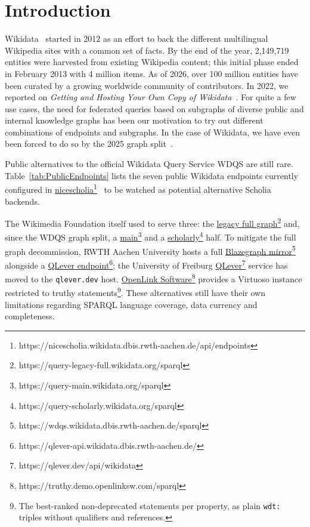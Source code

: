 \documentclass[
]{ceurart}
\newcommand{\footnotelink}[2]{\href{#1}{#2}\footnote{#1}}
\begin{document}
\section{Introduction}\label{sec:introduction}
Wikidata~\cite{Vrandecic2014} started in 2012 as an effort to back the different multilingual Wikipedia sites with a common set of facts. By the end of the year, 2,149,719 entities were harvested from existing Wikipedia content; this initial phase ended in February 2013 with 4 million items. As of 2026, over 100 million entities have been curated by a growing worldwide community of contributors. In 2022, we reported on \emph{Getting and Hosting Your Own Copy of Wikidata}~\cite{fahl2022wikidata}. For quite a few use cases, the need for federated queries based on subgraphs of diverse public and internal knowledge graphs has been our motivation to try out different combinations of endpoints and subgraphs. In the case of Wikidata, we have even been forced to do so by the 2025 graph split~\cite{willighagen2026scholia}.

Public alternatives to the official Wikidata Query Service WDQS are still rare. 
Table~\ref{tab:PublicEndpoints}
lists the seven public Wikidata endpoints currently configured in
\footnotelink{https://nicescholia.wikidata.dbis.rwth-aachen.de/api/endpoints}{nicescholia}~\cite{nicescholia} to be watched as potential alternative Scholia backends.

The Wikimedia Foundation itself used to serve three: the
\footnotelink{https://query-legacy-full.wikidata.org/sparql}{legacy full graph} and, since the
WDQS graph split, a \footnotelink{https://query-main.wikidata.org/sparql}{main} and a
\footnotelink{https://query-scholarly.wikidata.org/sparql}{scholarly} half. To mitigate the full graph decommission, RWTH Aachen University
hosts a full \footnotelink{https://wdqs.wikidata.dbis.rwth-aachen.de/sparql}{Blazegraph mirror}
alongside a \footnotelink{https://qlever-api.wikidata.dbis.rwth-aachen.de/}{QLever endpoint};
the University of Freiburg \footnotelink{https://qlever.dev/api/wikidata}{QLever} service has
moved to the \texttt{qlever.dev} host.
\footnotelink{https://truthy.demo.openlinksw.com/sparql}{OpenLink Software} provides a Virtuoso
instance restricted to truthy statements\footnote{The best-ranked non-deprecated statements per property, as plain \texttt{wdt:} triples without qualifiers and references.}. These alternatives still have their own limitations regarding SPARQL language coverage, data currency and completeness.
\end{document}
